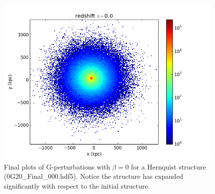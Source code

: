 \begin{figure}
\centering
\includegraphics[width=1.0\linewidth]{img/Read_OG_Final_2.png}
\caption{Final plots of G-perturbations with $ \beta = 0$ for a Hernquist structure (0G20\_Final\_000.hdf5). Notice the structure has expanded significantly with respect to the initial structure.}
\label{fig:test}
\end{figure}

